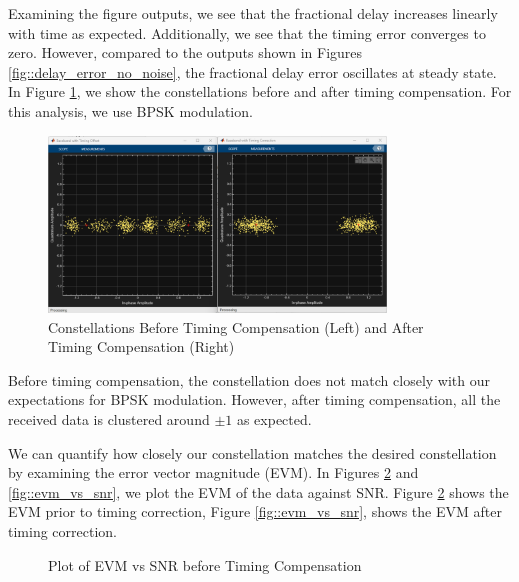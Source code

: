 \documentclass{article}
\begin{document}
\noindent Examining the figure outputs, we see that the fractional delay increases linearly with time as expected. Additionally, we see that the timing error converges to zero. However, compared to the outputs shown in Figures \ref{fig::delay_error_no_noise}, the fractional delay error oscillates at steady state. In Figure \ref{fig::constellations_with_timing_correction}, we show the constellations before and after timing compensation. For this analysis, we use BPSK modulation.
 
\begin{figure}[H]
	\centerline{\includegraphics[width=0.8\textwidth]{constellations_with_timing_correction.png}}
	\caption{Constellations Before Timing Compensation (Left) and After Timing Compensation (Right)}
	\label{fig::constellations_with_timing_correction}
\end{figure}

\noindent Before timing compensation, the constellation does not match closely with our expectations for BPSK modulation. However, after timing compensation, all the received data is clustered around $\pm 1$ as expected.

We can quantify how closely our constellation matches the desired constellation by examining the error vector magnitude (EVM). In Figures \ref{fig::evm_vs_snr_no_correction} and \ref{fig::evm_vs_snr}, we plot the EVM of the data against SNR. Figure \ref{fig::evm_vs_snr_no_correction} shows the EVM prior to timing correction, Figure \ref{fig::evm_vs_snr}, shows the EVM after timing correction. 

\begin{figure}[H]
	\centerline{}
	\caption{Plot of EVM vs SNR before Timing Compensation}
	\label{fig::evm_vs_snr_no_correction}
\end{figure}
\end{document}
